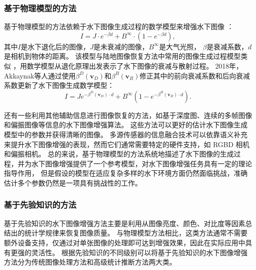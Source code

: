 \subsubsection{基于物理模型的方法}
基于物理模型的方法依赖于水下图像生成过程的数学模型来增强水下图像 \cite{uw_img_math1}\cite{uw_img_math2}：
\begin{equation}
I=J \cdot e^{-\beta d}+B^{\infty} \cdot\left(1-e^{-\beta d}\right),
\label{IFM1}
\end{equation}
其中$I$是水下退化后的图像，$J$是未衰减的图像，$B^{\infty}$是大气光照， $\beta$是衰减系数，$d$是相机到物体的距离。
该模型与陆地图像恢复方法中常用的图像生成过程模型类似 \cite{ifm}，用数学模型从退化原理出发表示了水下图像的衰减与散射过程。
2018年，Akkaynak等人\cite{modified_uw_img_math}通过使用$\beta^D\left(\mathbf{v}_D\right)$和$\beta^B\left(\mathbf{v}_B\right)$修正其中的前向衰减系数和后向衰减系数更新了水下图像生成数学模型：
\begin{equation}
    I=J e^{-\beta^D\left(\mathbf{v}_D\right) \cdot d}+B^{\infty}\left(1-e^{-\beta^B\left(\mathbf{v}_B\right) \cdot d}\right).
    \label{IFM2}
\end{equation}

还有一些利用其他辅助信息进行图像恢复的方法，如基于深度图\cite{depth_img}、连续的多帧图像\cite{multi_frame}和偏振图像\cite{U2PNet}等信息的水下图像增强算法。
这些方法可以更好的估计水下图像生成模型中的参数并获得清晰的图像。
多源传感器的信息融合技术\cite{fusion}可以依靠语义补充来提升水下图像增强的表现，然而它们通常需要特定的硬件支持，如 RGBD 相机和偏振相机。
总的来说，基于物理模型的方法系统地描述了水下图像的生成过程，并为水下图像增强提供了一个参考模型，对水下图像增强任务具有一定的理论指导作用，
但是假设的模型在适应复杂多样的水下环境方面仍然面临挑战，准确估计多个参数仍然是一项具有挑战性的工作。

\subsubsection{基于先验知识的方法}
基于先验知识的水下图像增强方法主要是利用从图像亮度、颜色、对比度等因素总结出的统计学规律来恢复图像质量。
与物理模型方法相比，这类方法通常不需要额外设备支持，仅通过对单张图像的处理即可达到增强效果，因此在实际应用中具有更强的灵活性。
根据先验知识的不同级别可以将基于先验知识的水下图像增强方法分为传统图像处理方法和高级统计推断方法两大类。

